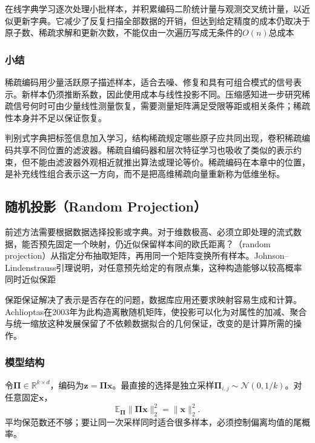 在线字典学习逐次处理小批样本，并积累编码二阶统计量与观测交叉统计量，以近似更新字典。它减少了反复扫描全部数据的开销，但达到给定精度的成本仍取决于原子数、稀疏求解和更新次数，不能仅由一次遍历写成无条件的$O(n)$总成本

\subsubsection{小结}
\label{sec:dim-sparse-coding-summary}

稀疏编码用少量活跃原子描述样本，适合去噪、修复和具有可组合模式的信号表示。新样本仍须推断系数，因此使用成本与线性投影不同。压缩感知进一步研究稀疏信号何时可由少量线性测量恢复，需要测量矩阵满足受限等距或相关条件；稀疏性本身并不足以保证恢复。

判别式字典把标签信息加入学习，结构稀疏规定哪些原子应共同出现，卷积稀疏编码共享不同位置的滤波器。稀疏自编码器和层次特征学习也吸收了类似的表示约束，但不能由滤波器外观相近就推出算法或理论等价。稀疏编码在本章中的位置，是补充线性组合表示这一方向，而不是把高维稀疏向量重新称为低维坐标。

\subsection{随机投影（Random Projection）}
\label{sec:dim-rp}

前述方法需要根据数据选择投影或字典。对于维数极高、必须立即处理的流式数据，能否预先固定一个映射，仍近似保留样本间的欧氏距离？（random projection）从指定分布抽取矩阵，再用同一个矩阵变换所有样本。Johnson--Lindenstrauss引理说明，对任意预先给定的有限点集，这种构造能够以较高概率同时近似保距

保距保证解决了表示是否存在的问题，数据库应用还要求映射容易生成和计算。Achlioptas在2003年为此构造离散随机矩阵，使投影可以化为对属性的加减、聚合与统一缩放这种发展保留了不依赖数据拟合的几何保证，改变的是计算所需的操作。

\subsubsection{模型结构}
\label{sec:dim-rp-structure}

令$\bm{\Pi}\in\mathbb{R}^{k\times d}$，编码为$\bm{z}=\bm{\Pi}\bm{x}$。最直接的选择是独立采样$\bm{\Pi}_{i,j}\sim\mathcal{N}(0,1/k)$。对任意固定$\bm{x}$，
\[
  \mathbb{E}_{\bm{\Pi}}\lVert\bm{\Pi}\bm{x}\rVert_2^2
  =\lVert\bm{x}\rVert_2^2.
\]
平均保范数还不够；要让同一次采样同时适合很多样本，必须控制偏离均值的尾概率。

